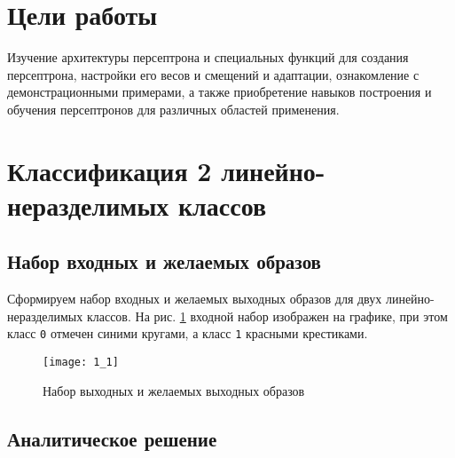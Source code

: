 





\tableofcontents
\newpage
\listoffigures
\newpage

\section{Цели работы}

Изучение архитектуры персептрона и специальных функций для создания персептрона, настройки его весов и смещений и адаптации, ознакомление с демонстрационными примерами, а также приобретение навыков построения и обучения персептронов для различных областей применения.

\section{Классификация 2 линейно-неразделимых классов}

\subsection{Набор входных и желаемых образов}


Сформируем набор входных и желаемых выходных образов для двух линейно-неразделимых классов. На рис. \ref{fig:1_1} входной набор изображен на графике, при этом класс \verb+0+ отмечен синими кругами, а класс \verb+1+ красными крестиками.

\begin{figure}[H]
\begin{center}
	\texttt{[image: 1\_1]}
	\caption{Набор выходных и желаемых выходных образов}
	\label{fig:1_1}
\end{center}
\end{figure}

\subsection{Аналитическое решение}


